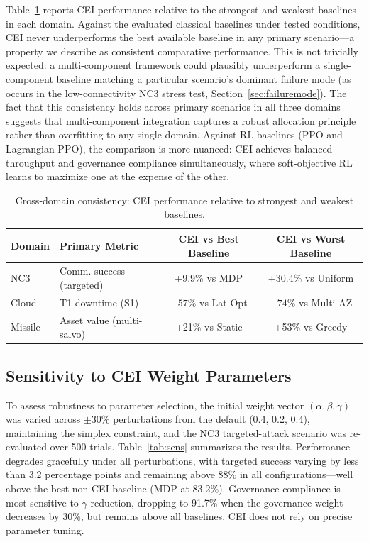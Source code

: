 \documentclass[runningheads]{llncs}
\begin{document}
Table~\ref{tab:cross7} reports CEI performance relative to the strongest and weakest baselines in each domain. Against the evaluated classical baselines under tested conditions, CEI never underperforms the best available baseline in any primary scenario---a property we describe as consistent comparative performance. This is not trivially expected: a multi-component framework could plausibly underperform a single-component baseline matching a particular scenario's dominant failure mode (as occurs in the low-connectivity NC3 stress test, Section~\ref{sec:failuremode}). The fact that this consistency holds across primary scenarios in all three domains suggests that multi-component integration captures a robust allocation principle rather than overfitting to any single domain. Against RL baselines (PPO and Lagrangian-PPO), the comparison is more nuanced: CEI achieves balanced throughput and governance compliance simultaneously, where soft-objective RL learns to maximize one at the expense of the other.

\begin{table}[ht]
\caption{Cross-domain consistency: CEI performance relative to strongest and weakest baselines.}
\label{tab:cross7}
\centering
\small
\begin{tabular}{lp{4cm}cc}
\toprule
Domain & Primary Metric & CEI vs Best Baseline & CEI vs Worst Baseline \\
\midrule
NC3     & Comm. success (targeted) & +9.9\% vs MDP        & +30.4\% vs Uniform \\
Cloud   & T1 downtime (S1)         & $-57\%$ vs Lat-Opt   & $-74\%$ vs Multi-AZ \\
Missile & Asset value (multi-salvo)& +21\% vs Static      & +53\% vs Greedy    \\
\bottomrule
\end{tabular}
\end{table}

\subsection{Sensitivity to CEI Weight Parameters}

To assess robustness to parameter selection, the initial weight vector $(\alpha, \beta, \gamma)$ was varied across $\pm 30\%$ perturbations from the default (0.4, 0.2, 0.4), maintaining the simplex constraint, and the NC3 targeted-attack scenario was re-evaluated over 500 trials. Table~\ref{tab:sens} summarizes the results. Performance degrades gracefully under all perturbations, with targeted success varying by less than 3.2 percentage points and remaining above 88\% in all configurations---well above the best non-CEI baseline (MDP at 83.2\%). Governance compliance is most sensitive to $\gamma$ reduction, dropping to 91.7\% when the governance weight decreases by 30\%, but remains above all baselines. CEI does not rely on precise parameter tuning.
\end{document}
